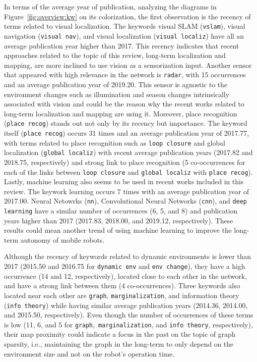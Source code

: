 In terms of the average year of publication, analyzing the diagrams in Figure~\ref{fig:overview:kw} on its colorization, the first observation is the recency of terms related to visual localization. The keywords visual SLAM (\texttt{vslam}), visual navigation (\texttt{visual nav}), and visual localization (\texttt{visual localiz}) have all an average publication year higher than 2017. This recency indicates that recent approaches related to the topic of this review, long-term localization and mapping, are more inclined to use vision as a sensorization input.
Another sensor that appeared with high relevance in the network is \texttt{radar}, with 15 occurrences and an average publication year of 2019.20. This sensor is agnostic to the environment changes such as illumination and season changes intrinsically associated with vision and could be the reason why the recent works related to long-term localization and mapping are using it.
Moreover, place recognition (\texttt{place recog}) stands out not only by its recency but importance. The keyword itself (\texttt{place recog}) occurs 31 times and an average publication year of 2017.77, with terms related to place recognition such as \texttt{loop closure} and global localization (\texttt{global localiz}) with recent average publication years (2017.82 and 2018.75, respectively) and strong link to place recognition (5 co-occurrences for each of the links between \texttt{loop closure} and \texttt{global localiz} with \texttt{place recog}). Lastly, machine learning also seems to be used in recent works included in this review. The keywork learning occurs 7 times with an average publication year of 2017.00. Neural Netowrks (\texttt{nn}), Convolutional Neural Networks (\texttt{cnn}), and \texttt{deep learning} have a similar number of occurrences (6, 5, and 8) and publication years higher than 2017 (2017.83, 2018.00, and 2019.12, respectively). These results could mean another trend of using machine learning to improve the long-term autonomy of mobile robots.

Although the recency of keywords related to dynamic environments is lower than 2017 (2015.50 and 2016.75 for \texttt{dynamic env} and \texttt{env change}), they have a high occurrence (14 and 12, respectively), located close to each other in the network, and have a strong link between them (4 co-occurrences). Three keywords also located near each other are \texttt{graph}, \texttt{marginalization}, and information theory (\texttt{info theory}) while having similar average publication years (2014.36, 2014.00, and 2015.50, respectively). Even though the number of occurrences of these terms is low (11, 6, and 5 for \texttt{graph},\texttt{ marginalization}, and \texttt{info theory}, respectively), their map proximity could indicate a focus in the past on the topic of graph sparsity, i.e., maintaining the graph in the long-term to only depend on the environment size and not on the robot's operation time.

